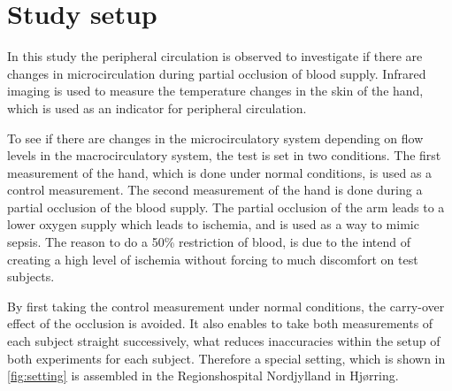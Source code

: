 \chapter{Study setup}

In this study the peripheral circulation is observed to investigate if there are changes in microcirculation during partial occlusion of blood supply. Infrared imaging is used to measure the temperature changes in the skin of the hand, which is used as an indicator for peripheral circulation. 


To see if there are changes in the microcirculatory system depending on flow levels in the macrocirculatory system, the test is set in two conditions. The first measurement of the hand, which is done under normal conditions, is used as a control measurement. The second measurement of the hand is done during a partial occlusion of the blood supply. The partial occlusion of the arm leads to a lower oxygen supply which leads to ischemia, and is used as a way to mimic sepsis. The reason to do a 50\% restriction of blood, is due to the intend of creating a high level of ischemia without forcing to much discomfort on test subjects.

By first taking the control measurement under normal conditions, the carry-over effect of the occlusion is avoided. It also enables to take both measurements of each subject straight successively, what reduces inaccuracies within the setup of both experiments for each subject. Therefore a special setting, which is shown in \cref{fig:setting} is assembled in the Regionshospital Nordjylland in Hj\o{}rring.